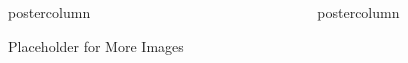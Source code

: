 \documentclass[final,hyperref={pdfpagelabels=false}]{beamer}
\newlength{\columnheight}
\begin{document}
\begin{frame}
\begin{columns}
\begin{column}{.33\textwidth}
\begin{beamercolorbox}[center,wd=\textwidth]{postercolumn}
\begin{minipage}[T]{.95\textwidth}
{\begin{block}{Placeholder for More Images}
\begin{figure}
              \end{figure}
            \end{block}
          }
        \end{minipage}
      \end{beamercolorbox}
    \end{column}

    \begin{column}{.33\textwidth}
      \begin{beamercolorbox}[center,wd=\textwidth]{postercolumn}
        \begin{minipage}[T]{.95\textwidth} %
          \parbox[t][\columnheight]{\textwidth}{ %

}
\end{minipage}
\end{beamercolorbox}
\end{column}
\end{columns}
\end{frame}
\end{document}
